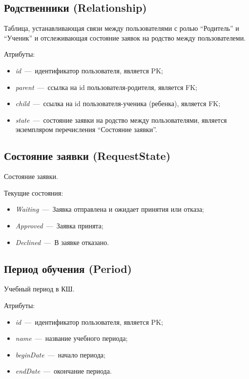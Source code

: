 \documentclass[14pt]{article}
\begin{document}
\subsection{Родственники (Relationship)}

Таблица, устанавливающая связи между пользователями с ролью ``Родитель'' и ``Ученик'' и отслеживающая состояние заявок на родство между пользователеми.

Атрибуты:
\begin{itemize}
	\item \emph{id}~---~идентификатор пользователя, является PK;
	\item \emph{parent}~---~ссылка на id пользователя-родителя, является FK;
	\item \emph{child}~---~ссылка на id пользователя-ученика (ребенка), является FK;
	\item \emph{state}~---~состояние заявки на родство между пользователями, является экземпляром перечисления ``Состояние заявки''.
\end{itemize}

\subsection{Состояние заявки (RequestState)}

Состояние заявки.

Текущие состояния:
\begin{itemize}
	\item \emph{Waiting}~---~Заявка отправлена и ожидает принятия или отказа;
	\item \emph{Approved}~---~Заявка принята;
	\item \emph{Declined}~---~В заявке отказано.
\end{itemize}

\subsection{Период обучения (Period)}

Учебный период в КШ.

Атрибуты:
\begin{itemize}
	\item \emph{id}~---~идентификатор пользователя, является PK;
	\item \emph{name}~---~название учебного периода;
	\item \emph{beginDate}~---~начало периода;
	\item \emph{endDate}~---~окончание периода.
\end{itemize}
\end{document}
